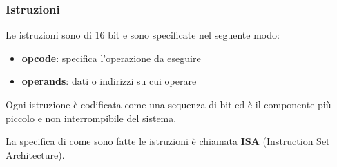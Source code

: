 \documentclass[a4paper]{article}
\theoremstyle{break}
\theoremstyle{break}
\theoremstyle{break}
\theoremstyle{break}
\begin{document}
\subsubsection{Istruzioni}
Le istruzioni sono di 16 bit e sono specificate nel seguente modo:
\begin{itemize}
	\item \textbf{opcode}: specifica l'operazione da eseguire
	\item \textbf{operands}: dati o indirizzi su cui operare
\end{itemize}
Ogni istruzione è codificata come una sequenza di bit ed è il componente più piccolo
e non interrompibile del sistema.

\vspace{1em}
\noindent La specifica di come sono fatte le istruzioni è chiamata \textbf{ISA}
(Instruction Set Architecture).
\end{document}
